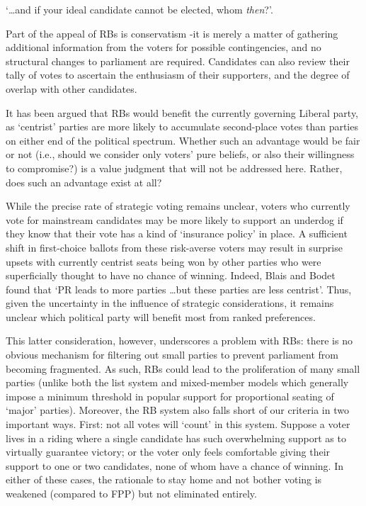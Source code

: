 \begin{tcolorbox}[colback=white!5!white,colframe=blue!55!black]
`\ldots and if your ideal candidate cannot be elected, whom \emph{then}?'.
\end{tcolorbox}

Part of the appeal of RBs is conservatism \--it is merely a matter of gathering additional information from the voters for possible contingencies, and no structural changes to parliament are required. Candidates can also review their tally of votes to ascertain the enthusiasm of their supporters, and the degree of overlap with other candidates.

It has been argued\citep{Record} that RBs would benefit the currently governing Liberal party, as `centrist' parties are more likely to accumulate second-place votes than parties on either end of the political spectrum.
Whether such an advantage would be fair or not (i.e., should we consider only voters' pure beliefs, or also their willingness to compromise?) is a value judgment that will not be addressed here. Rather, does such an advantage exist at all?

While the precise rate of strategic voting remains unclear, voters who currently vote for mainstream candidates may be more likely to support an underdog if they know that their vote has a kind of `insurance policy' in place.
A sufficient shift in first-choice ballots from these risk-averse voters may result in surprise upsets with currently centrist seats being won by other parties who were superficially thought to have no chance of winning. Indeed, Blais and Bodet found that `PR  leads to more parties \ldots but these parties are less centrist'\citep{Blais_2006}.
Thus, given the uncertainty in the influence of strategic considerations, it remains  unclear which political party will benefit most from ranked preferences.

This latter consideration, however, underscores a problem with RBs:  there is no obvious mechanism for filtering out small parties to prevent parliament from becoming fragmented. As such, RBs could lead to the proliferation of many small parties
(unlike both the list system and  mixed-member models which generally impose a minimum threshold in popular support for proportional seating of `major' parties).
Moreover, the RB system also falls short of our criteria in two important ways.
First: not all votes will `count' in this system.
Suppose a voter lives in a riding where a single candidate has such overwhelming support as to virtually guarantee victory; or the voter only feels comfortable giving their support to one or two candidates, none of whom have a chance of winning.
In either of these cases, the rationale to stay home and not bother voting is weakened (compared to FPP) but not eliminated entirely.

